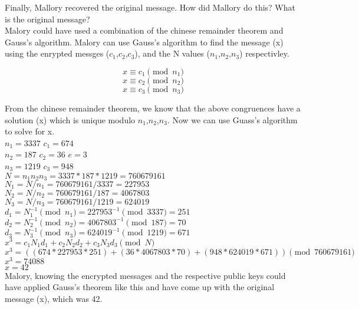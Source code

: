 \documentclass{article}
\begin{document}
\noindent Finally, Mallory recovered the original message. How did
Mallory do this? What is the original message?\\

 Malory could have used a combination of
the chinese remainder theorem and Gauss's algorithm. Malory can use Gauss's
algorithm to find the message (x) using the enrypted messges ($c_1$,$c_2$,$c_3$),
and the N values ($n_1$,$n_2$,$n_3$) respectivley.

$$x \equiv c_1 \pmod{n_1}$$
$$x \equiv c_2 \pmod{n_2}$$
$$x \equiv c_3 \pmod{n_3}$$

\noindent From the chinese remainder theorem, we know that the above congruences
have a solution (x) which is unique modulo $n_1$,$n_2$,$n_3$. Now we can use Guass's
algorithm to solve for x.\\

\noindent $n_1 = 3337$ \hspace{1in} $c_1 = 674$\\
$n_2 = 187$ \hspace{1.1in} $c_2 = 36$ \hspace{1in} $e = 3$\\
$n_3 = 1219$ \hspace{1in} $c_3 = 948$\\
$N = n_1n_2n_3 = 3337*187*1219 = 760679161$\\
$N_1 = N/n_1 = 760679161/3337 = 227953$\\
$N_2 = N/n_2 = 760679161/187 = 4067803$\\
$N_3 = N/n_3 = 760679161/1219 = 624019$\\
$d_1 = N_1^{-1} \pmod{n_1} = 227953^{-1} \pmod{3337} = 251$\\
$d_2 = N_2^{-1} \pmod{n_2} = 4067803^{-1} \pmod{187} = 70$\\
$d_3 = N_3^{-1} \pmod{n_3} = 624019^{-1} \pmod{1219} = 671$\\
$x^{3} = c_1N_1d_1 + c_2N_2d_2 + c_3N_3d_3 \pmod {N}$\\
$x^{3} = ((674*227953*251)+(36*4067803*70)+(948*624019*671))\pmod{760679161}$\\
$x^{3} = 74088$\\
$x = 42$\\

\noindent Malory, knowing the encrypted messages and the respective public keys could have
applied Gauss's theorem like this and have come up with the original message (x), which was 42.
\end{document}
